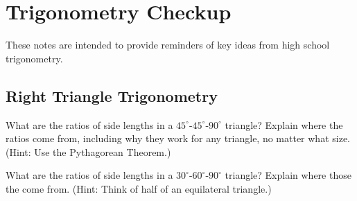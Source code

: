 \newpage 

\section{Trigonometry Checkup}
These notes are intended to provide reminders of key ideas from high school trigonometry. 

\subsection{Right Triangle Trigonometry}
\begin{prob}
What are the ratios of side lengths in a $45^\circ$-$45^\circ$-$90^\circ$ triangle?  Explain where the ratios come from, including why they work for any triangle, no matter what size.  (Hint: Use the Pythagorean Theorem.)
\end{prob}

\begin{prob}
What are the ratios of side lengths in a $30^\circ$-$60^\circ$-$90^\circ$ triangle?  Explain where those the come from.  (Hint: Think of half of an equilateral triangle.)
\end{prob}

